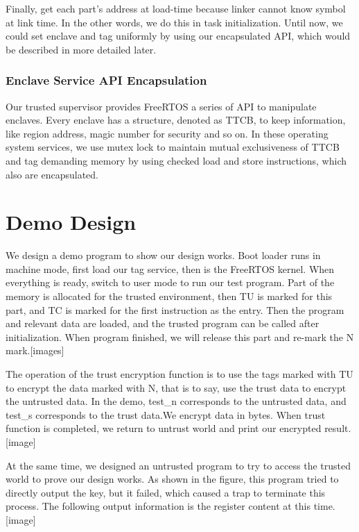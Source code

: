 \documentclass[conference]{IEEEtran}
\begin{document}
Finally, get each part's address at load-time because linker cannot know symbol at link time. In the other words, we do this in task initialization. Until now, we could set enclave and tag uniformly by using our encapsulated API, which would be described in more detailed later.

\subsubsection{Enclave Service API Encapsulation}

Our trusted supervisor provides FreeRTOS a series of API to manipulate enclaves. Every enclave has a structure, denoted as TTCB, to keep information, like region address, magic number for security and so on. In these operating system services, we use mutex lock to maintain mutual exclusiveness of TTCB and tag demanding memory by using checked load and store instructions, which also are encapsulated.

\section{Demo Design}
We design a demo program to show our design works. Boot loader runs in machine mode, first load our tag service, then is the FreeRTOS kernel. When everything is ready, switch to user mode to run our test program. Part of the memory is allocated for the trusted environment, then TU is marked for this part, and TC is marked for the first instruction as the entry. Then the program and relevant data are loaded, and the trusted program can be called after initialization. When program finished, we will release this part and re-mark the N mark.[images]

The operation of the trust encryption function is to use the tags marked with TU to encrypt the data marked with N, that is to say, use the trust data to encrypt the untrusted data. In the demo, test\_n corresponds to the untrusted data, and test\_s corresponds to the trust data.We encrypt data in bytes. When  trust function is completed, we return to untrust world and print our encrypted result.[image]

At the same time, we designed an untrusted program to try to access the trusted world to prove our design works. As shown in the figure, this program tried to directly output the key, but it failed, which caused a trap to terminate this process. The following output information is the register content at this time.[image]
\end{document}
